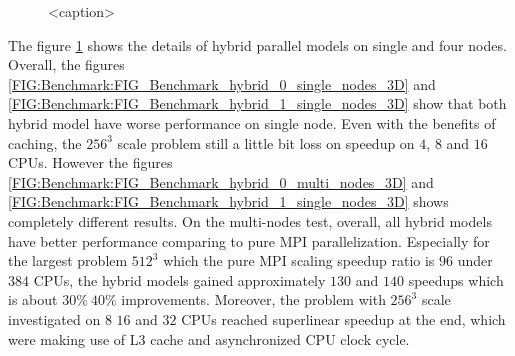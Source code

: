 \begin{figure}[htbp]
{    \label{FIG:Benchmark:FIG_Benchmark_hybrid_0_multi_nodes_3D}
  }
  \hspace{0em} 
  \caption{<caption>}
  \label{FIG:Benchmark:Hybrid_Single_Four_Node_3D}
\end{figure}

The figure \ref{FIG:Benchmark:Hybrid_Single_Four_Node_3D} shows the details of hybrid parallel models on single and four nodes.
Overall, the figures \ref{FIG:Benchmark:FIG_Benchmark_hybrid_0_single_nodes_3D} and \ref{FIG:Benchmark:FIG_Benchmark_hybrid_1_single_nodes_3D}
show that both hybrid model have worse performance on single node. Even with the benefits of caching, the $256^3$ scale problem still 
a little bit loss on speedup on $4$, $8$ and $16$ CPUs.
However the figures \ref{FIG:Benchmark:FIG_Benchmark_hybrid_0_multi_nodes_3D} and \ref{FIG:Benchmark:FIG_Benchmark_hybrid_1_single_nodes_3D} 
shows completely different results.
On the multi-nodes test, overall, all hybrid models have better performance comparing to pure MPI parallelization.
Especially for the largest problem $512^3$ which the pure MPI scaling speedup ratio is $96$ under $384$ CPUs, the 
hybrid models gained approximately $130$ and $140$ speedups which is about $30\% ~ 40\%$ improvements.
Moreover, the problem with $256^3$ scale investigated on $8$ $16$ and $32$ CPUs reached superlinear speedup at the end,
which were making use of L3 cache and asynchronized CPU clock cycle.

